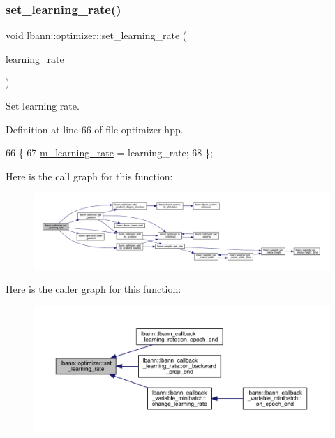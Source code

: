 \subsubsection{\texorpdfstring{set\+\_\+learning\+\_\+rate()}{set\_learning\_rate()}}
{\footnotesize\ttfamily void lbann\+::optimizer\+::set\+\_\+learning\+\_\+rate (\begin{DoxyParamCaption}\item[{Data\+Type}]{learning\+\_\+rate }\end{DoxyParamCaption})\hspace{0.3cm}{\ttfamily [inline]}}

Set learning rate. 

Definition at line 66 of file optimizer.\+hpp.


\begin{DoxyCode}
66                                                  \{
67     \hyperlink{classlbann_1_1optimizer_ad393dcdcb82b44510c586ed5ec46d4dd}{m\_learning\_rate} = learning\_rate;
68   \};
\end{DoxyCode}
Here is the call graph for this function\+:\nopagebreak
\begin{figure}[H]
\begin{center}
\leavevmode
\includegraphics[width=350pt]{classlbann_1_1optimizer_a147cac09beaa17df4e0fc1fc1be3abce_cgraph}
\end{center}
\end{figure}
Here is the caller graph for this function\+:\nopagebreak
\begin{figure}[H]
\begin{center}
\leavevmode
\includegraphics[width=350pt]{classlbann_1_1optimizer_a147cac09beaa17df4e0fc1fc1be3abce_icgraph}
\end{center}
\end{figure}
\mbox{\label{classlbann_1_1optimizer_afc00daf2acb6af7e29786524126660c2}} 
